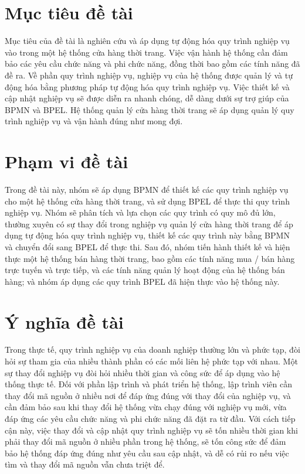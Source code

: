 \section{Mục tiêu đề tài}
\hspace{0.5cm}Mục tiêu của đề tài là nghiên cứu và áp dụng tự động hóa quy trình nghiệp vụ vào trong một hệ thống cửa hàng thời trang. Việc vận hành hệ thống cần đảm bảo các yêu cầu chức năng và phi chức năng, đồng thời bao gồm các tính năng đã đề ra. Về phần quy trình nghiệp vụ, nghiệp vụ của hệ thống được quản lý và tự động hóa bằng phương pháp tự động hóa quy trình nghiệp vụ. Việc thiết kế và cập nhật nghiệp vụ sẽ được diễn ra nhanh chóng, dễ dàng dưới sự trợ giúp của BPMN và BPEL. Hệ thống quản lý cửa hàng thời trang sẽ áp dụng quản lý quy trình nghiệp vụ và vận hành đúng như mong đợi.

\section{Phạm vi đề tài}
\hspace{0.5cm}Trong đề tài này, nhóm sẽ áp dụng BPMN để thiết kế các quy trình nghiệp vụ cho một hệ thống cửa hàng thời trang, và sử dụng BPEL để thực thi quy trình nghiệp vụ. Nhóm sẽ phân tích và lựa chọn các quy trình có quy mô đủ lớn, thường xuyên có sự thay đổi trong nghiệp vụ quản lý cửa hàng thời trang để áp dụng tự động hóa quy trình nghiệp vụ, thiết kế các quy trình này bằng BPMN và chuyển đổi sang BPEL để thực thi. Sau đó, nhóm tiến hành thiết kế và hiện thực một hệ thống bán hàng thời trang, bao gồm các tính năng mua / bán hàng trực tuyến và trực tiếp, và các tính năng quản lý hoạt động của hệ thống bán hàng; và nhóm áp dụng các quy trình BPEL đã hiện thực vào hệ thống này.

\section{Ý nghĩa đề tài}
\hspace{0.5cm} Trong thực tế, quy trình nghiệp vụ của doanh nghiệp thường lớn và phức tạp, đòi hỏi sự tham gia của nhiều thành phần có các mối liên hệ phức tạp với nhau. Một sự thay đổi nghiệp vụ đòi hỏi nhiều thời gian và công sức để áp dụng vào hệ thống thực tế. Đối với phần lập trình và phát triển hệ thống, lập trình viên cần thay đổi mã nguồn ở nhiều nơi để đáp ứng đúng với thay đổi của nghiệp vụ, và cần đảm bảo sau khi thay đổi hệ thống vừa chạy đúng với nghiệp vụ mới, vừa đáp ứng các yêu cầu chức năng và phi chức năng đã đặt ra từ đầu. Với cách tiếp cận này, việc thay đổi và cập nhật quy trình nghiệp vụ sẽ tốn nhiều thời gian khi phải thay đổi mã nguồn ở nhiều phần trong hệ thống, sẽ tốn công sức để đảm bảo hệ thống đáp ứng đúng như yêu cầu sau cập nhật, và dễ có rủi ro nếu việc tìm và thay đổi mã nguồn vẫn chưa triệt để.\\

